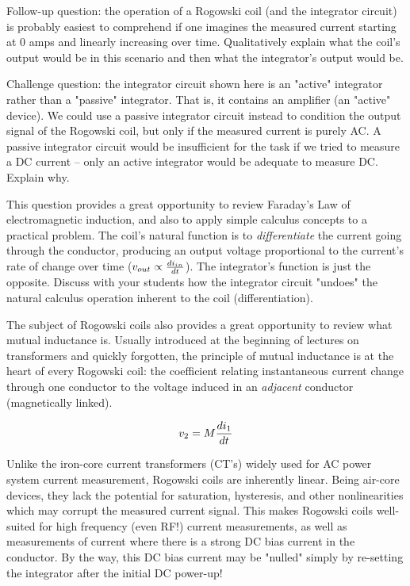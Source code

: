 \vskip 10pt

Follow-up question: the operation of a Rogowski coil (and the integrator circuit) is probably easiest to comprehend if one imagines the measured current starting at 0 amps and linearly increasing over time.  Qualitatively explain what the coil's output would be in this scenario and then what the integrator's output would be.

\vskip 10pt

Challenge question: the integrator circuit shown here is an "active" integrator rather than a "passive" integrator.  That is, it contains an amplifier (an "active" device).  We could use a passive integrator circuit instead to condition the output signal of the Rogowski coil, but only if the measured current is purely AC.  A passive integrator circuit would be insufficient for the task if we tried to measure a DC current -- only an active integrator would be adequate to measure DC.  Explain why.







This question provides a great opportunity to review Faraday's Law of electromagnetic induction, and also to apply simple calculus concepts to a practical problem.  The coil's natural function is to {\it differentiate} the current going through the conductor, producing an output voltage proportional to the current's rate of change over time ($v_{out} \propto {di_{in} \over dt}$).  The integrator's function is just the opposite.  Discuss with your students how the integrator circuit "undoes" the natural calculus operation inherent to the coil (differentiation).

The subject of Rogowski coils also provides a great opportunity to review what mutual inductance is.  Usually introduced at the beginning of lectures on transformers and quickly forgotten, the principle of mutual inductance is at the heart of every Rogowski coil: the coefficient relating instantaneous current change through one conductor to the voltage induced in an {\it adjacent} conductor (magnetically linked).

$$v_2 = M {di_1 \over dt}$$

Unlike the iron-core current transformers (CT's) widely used for AC power system current measurement, Rogowski coils are inherently linear.  Being air-core devices, they lack the potential for saturation, hysteresis, and other nonlinearities which may corrupt the measured current signal.  This makes Rogowski coils well-suited for high frequency (even RF!) current measurements, as well as measurements of current where there is a strong DC bias current in the conductor.  By the way, this DC bias current may be "nulled" simply by re-setting the integrator after the initial DC power-up!

